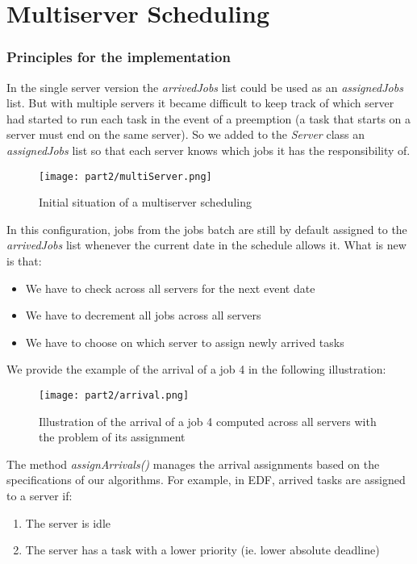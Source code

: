 \documentclass[./report.tex]{subfiles}
\begin{document}
\part{Multiserver Scheduling}

\section{Principles for the implementation}

In the single server version the \textit{arrivedJobs} list could be used as an \textit{assignedJobs} list. But with multiple servers it became difficult to keep track of which server had started to run each task in the event of a preemption (a task that starts on a server must end on the same server). So we added to the \textit{Server} class an \textit{assignedJobs} list so that each server knows which jobs it has the responsibility of.

\begin{figure}[!h]
	\center
	\texttt{[image: part2/multiServer.png]}
	\caption{Initial situation of a multiserver scheduling}
	\label{fig:multiServer_init} 
\end{figure}

In this configuration, jobs from the jobs batch are still by default assigned to the \textit{arrivedJobs} list whenever the current date in the schedule allows it. What is new is that:
\begin{itemize}
	\item We have to check across all servers for the next event date
	\item We have to decrement all jobs across all servers
	\item We have to choose on which server to assign newly arrived tasks\\
\end{itemize}

We provide the example of the arrival of a job 4 in the following illustration:
\begin{figure}[!h]
	\center
	\texttt{[image: part2/arrival.png]}
	\caption{Illustration of the arrival of a job 4 computed across all servers with the problem of its assignment}
	\label{fig:multiServer_events} 
\end{figure}

\newpage
 The method \textit{assignArrivals()} manages the arrival assignments based on the specifications of our algorithms. For example, in EDF, arrived tasks are assigned to a server if:
\begin{enumerate}
	\item The server is idle
	\item The server has a task with a lower priority (ie. lower absolute deadline)\\
\end{enumerate}
\end{document}
